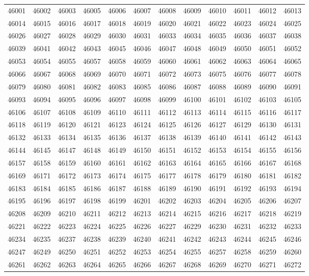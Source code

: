 \begin{center}
\begin{longtable}{llllllllllll}
46001 &46002 &46003 &46005 &46006 &46007 &46008 &46009 &46010 &46011 &46012 &46013 \\
46014 &46015 &46016 &46017 &46018 &46019 &46020 &46021 &46022 &46023 &46024 &46025 \\
46026 &46027 &46028 &46029 &46030 &46031 &46033 &46034 &46035 &46036 &46037 &46038 \\
46039 &46041 &46042 &46043 &46045 &46046 &46047 &46048 &46049 &46050 &46051 &46052 \\
46053 &46054 &46055 &46057 &46058 &46059 &46060 &46061 &46062 &46063 &46064 &46065 \\
46066 &46067 &46068 &46069 &46070 &46071 &46072 &46073 &46075 &46076 &46077 &46078 \\
46079 &46080 &46081 &46082 &46083 &46085 &46086 &46087 &46088 &46089 &46090 &46091 \\
46093 &46094 &46095 &46096 &46097 &46098 &46099 &46100 &46101 &46102 &46103 &46105 \\
46106 &46107 &46108 &46109 &46110 &46111 &46112 &46113 &46114 &46115 &46116 &46117 \\
46118 &46119 &46120 &46121 &46123 &46124 &46125 &46126 &46127 &46129 &46130 &46131 \\
46132 &46133 &46134 &46135 &46136 &46137 &46138 &46139 &46140 &46141 &46142 &46143 \\
46144 &46145 &46147 &46148 &46149 &46150 &46151 &46152 &46153 &46154 &46155 &46156 \\
46157 &46158 &46159 &46160 &46161 &46162 &46163 &46164 &46165 &46166 &46167 &46168 \\
46169 &46171 &46172 &46173 &46174 &46175 &46177 &46178 &46179 &46180 &46181 &46182 \\
46183 &46184 &46185 &46186 &46187 &46188 &46189 &46190 &46191 &46192 &46193 &46194 \\
46195 &46196 &46197 &46198 &46199 &46201 &46202 &46203 &46204 &46205 &46206 &46207 \\
46208 &46209 &46210 &46211 &46212 &46213 &46214 &46215 &46216 &46217 &46218 &46219 \\
46221 &46222 &46223 &46224 &46225 &46226 &46227 &46229 &46230 &46231 &46232 &46233 \\
46234 &46235 &46237 &46238 &46239 &46240 &46241 &46242 &46243 &46244 &46245 &46246 \\
46247 &46249 &46250 &46251 &46252 &46253 &46254 &46255 &46257 &46258 &46259 &46260 \\
46261 &46262 &46263 &46264 &46265 &46266 &46267 &46268 &46269 &46270 &46271 &46272 \\

\end{longtable}
\end{center}
